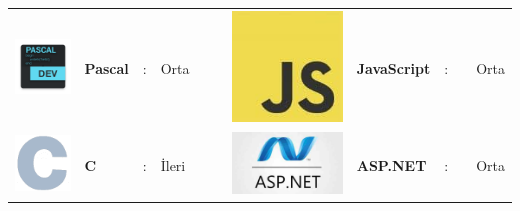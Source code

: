 \documentclass[paper=a4,fontsize=11pt]{temp} %
\begin{document}
\begin{minipage}[t]{0.66\textwidth}
\begin{tabular}{lllllllllll}
\includegraphics[scale=0.02]{IMG/languages/pascal} & \textbf{Pascal}   & : & Orta  &  &  & \includegraphics[scale=0.075]{IMG/languages/javascript} & \textbf{JavaScript} & : &  & Orta  \\
\includegraphics[scale=0.05]{IMG/languages/c} & \textbf{C}        & : & İleri &  &  & \includegraphics[scale=0.015]{IMG/languages/aspnet} & \textbf{ASP.NET}    & : &  & Orta  \\

\end{tabular}
\end{minipage}
\end{document}
